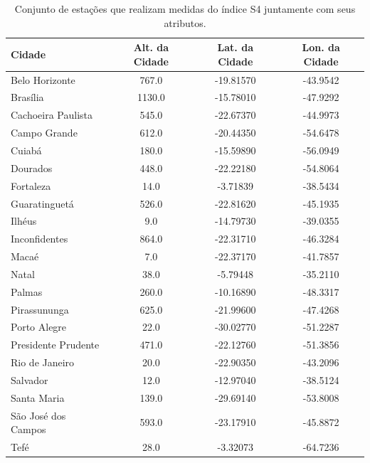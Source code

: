 \begin{table}
\begin{center}
\begin{tabular}{|l|c|c|c|}
\hline
Cidade              &   Alt. da Cidade &  Lat. da Cidade &  Lon. da Cidade \\ \hline
Belo Horizonte      &            767.0 &       -19.81570 &        -43.9542 \\ \hline
Brasília            &           1130.0 &       -15.78010 &        -47.9292 \\ \hline
Cachoeira Paulista  &            545.0 &       -22.67370 &        -44.9973 \\ \hline
Campo Grande        &            612.0 &       -20.44350 &        -54.6478 \\ \hline
Cuiabá              &            180.0 &       -15.59890 &        -56.0949 \\ \hline
Dourados            &            448.0 &       -22.22180 &        -54.8064 \\ \hline
Fortaleza           &             14.0 &        -3.71839 &        -38.5434 \\ \hline
Guaratinguetá       &            526.0 &       -22.81620 &        -45.1935 \\ \hline
Ilhéus              &              9.0 &       -14.79730 &        -39.0355 \\ \hline
Inconfidentes       &            864.0 &       -22.31710 &        -46.3284 \\ \hline
Macaé               &              7.0 &       -22.37170 &        -41.7857 \\ \hline
Natal               &             38.0 &        -5.79448 &        -35.2110 \\ \hline
Palmas              &            260.0 &       -10.16890 &        -48.3317 \\ \hline
Pirassununga        &            625.0 &       -21.99600 &        -47.4268 \\ \hline
Porto Alegre        &             22.0 &       -30.02770 &        -51.2287 \\ \hline
Presidente Prudente &            471.0 &       -22.12760 &        -51.3856 \\ \hline
Rio de Janeiro      &             20.0 &       -22.90350 &        -43.2096 \\ \hline
Salvador            &             12.0 &       -12.97040 &        -38.5124 \\ \hline
Santa Maria         &            139.0 &       -29.69140 &        -53.8008 \\ \hline
São José dos Campos &            593.0 &       -23.17910 &        -45.8872 \\ \hline
Tefé                &             28.0 &        -3.32073 &        -64.7236 \\ \hline
\end{tabular}
\end{center}

\vspace{12pt}

\caption{Conjunto de estações que realizam medidas do índice S4 juntamente com seus atributos.}
\label{tab:stations}
\end{table}


